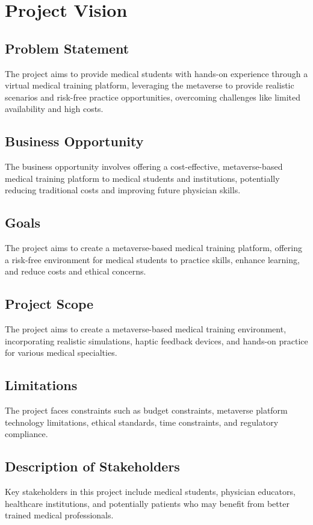 \chapter{Project Vision}
\label{ch:vision}
\section{Problem Statement}
The project aims to provide medical students with hands-on experience through a virtual medical training platform, leveraging the metaverse to provide realistic scenarios and risk-free practice opportunities, overcoming challenges like limited availability and high costs.

\section{Business Opportunity}
The business opportunity involves offering a cost-effective, metaverse-based medical training platform to medical students and institutions, potentially reducing traditional costs and improving future physician skills.
\section{Goals}
The project aims to create a metaverse-based medical training platform, offering a risk-free environment for medical students to practice skills, enhance learning, and reduce costs and ethical concerns.

\section{Project Scope}
The project aims to create a metaverse-based medical training environment, incorporating realistic simulations, haptic feedback devices, and hands-on practice for various medical specialties.
\section{Limitations}
The project faces constraints such as budget constraints, metaverse platform technology limitations, ethical standards, time constraints, and regulatory compliance.

\section{Description of Stakeholders}
Key stakeholders in this project include medical students, physician educators, healthcare institutions, and potentially patients who may benefit from better trained medical professionals.


